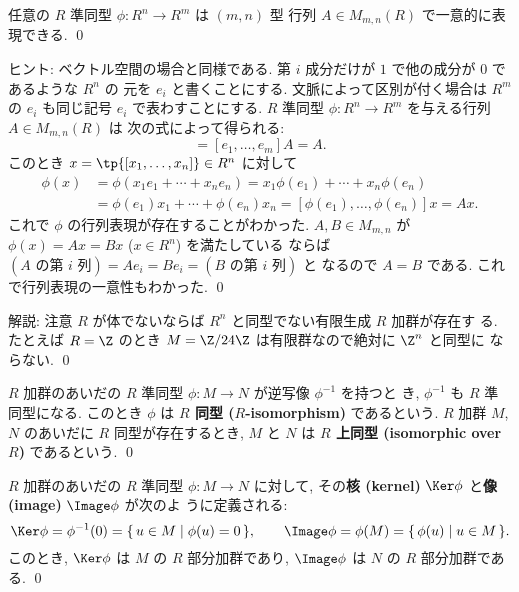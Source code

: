 \documentclass[12pt,twoside]{jarticle}
\begin{document}

\begin{question}
\label{q:R-hom-matrix}
  任意の $R$ 準同型 $\phi:R^n\to R^m$ は $(m,n)$ 型
  行列 $A\in M_{m,n}(R)$ で一意的に表現できる.
  \qed
\end{question}

\noindent
ヒント: ベクトル空間の場合と同様である.
第 $i$ 成分だけが $1$ で他の成分が $0$ であるような $R^n$ の
元を $e_i$ と書くことにする.  文脈によって区別が付く場合は $R^m$ 
の $e_i$ も同じ記号 $e_i$ で表わすことにする. 
$R$ 準同型 $\phi:R^n\to R^m$ を与える行列 $A\in M_{m,n}(R)$ は
次の式によって得られる:
\begin{equation*}
  [\phi(e_1),\dots,\phi(e_n)] = [e_1,\dots,e_m]A = A.
\end{equation*}
このとき $x=\tp{[x_1,\dots,x_n]}\in R^n$ に対して
\begin{align*}
  \phi(x) 
  &
  = \phi(x_1e_1+\cdots+x_ne_n)
  = x_1\phi(e_1) + \cdots + x_n\phi(e_n)
  \\ &
  = \phi(e_1)x_1 + \cdots + \phi(e_n)x_n
  = [\phi(e_1),\dots,\phi(e_n)]x
  = Ax.
\end{align*}
これで $\phi$ の行列表現が存在することがわかった. 
$A,B\in M_{m,n}$ が $\phi(x)=Ax=Bx$ ($x\in R^n$) を満たしている
ならば $(\text{$A$ の第 $i$ 列})=Ae_i=Be_i=(\text{$B$ の第 $i$ 列})$ と
なるので $A=B$ である.  これで行列表現の一意性もわかった.
\qed

\medskip
\noindent
解説: 注意 $R$ が体でないならば $R^n$ と同型でない有限生成 $R$ 加群が存在す
る. たとえば $R=\Z$ のとき $M=\Z/24\Z$ は有限群なので絶対に $\Z^n$ と同型に
ならない.
\qed


\begin{question}[同型写像]
  $R$ 加群のあいだの $R$ 準同型 $\phi:M\to N$ が逆写像 $\phi^{-1}$ を持つと
  き, $\phi^{-1}$ も $R$ 準同型になる.
  このとき $\phi$ は {\bf $R$ 同型 ($R$-isomorphism)} であるという.
  $R$ 加群 $M$, $N$ のあいだに $R$ 同型が存在するとき, 
  $M$ と $N$ は {\bf $R$ 上同型 (isomorphic over $R$)} であるという.
  \qed
\end{question}


\begin{question}[核と像]
  $R$ 加群のあいだの $R$ 準同型 $\phi:M\to N$ に対して, 
  その{\bf 核 (kernel)} $\Ker\phi$ と{\bf 像 (image)} $\Image\phi$ が次のよ
  うに定義される: 
  \begin{equation*}
    \Ker\phi = \phi^{-1}(0) = \{\, u\in M \mid \phi(u) = 0 \,\},
    \qquad
    \Image\phi = \phi(M) = \{\, \phi(u) \mid u \in M \,\}.
  \end{equation*}
  このとき, $\Ker\phi$ は $M$ の $R$ 部分加群であり, 
  $\Image\phi$ は $N$ の $R$ 部分加群である.
  \qed
\end{question}
\end{document}
